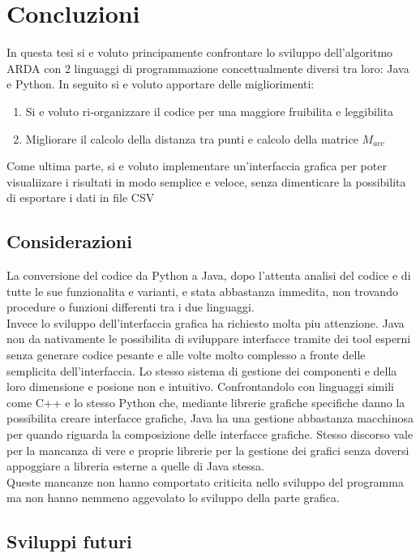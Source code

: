 \chapter{Concluzioni}
In questa tesi si e voluto principamente confrontare lo sviluppo dell'algoritmo
ARDA con 2 linguaggi di programmazione concettualmente diversi tra loro: Java e Python.
In seguito si e voluto apportare delle migliorimenti:
\begin{enumerate}
    \item Si e voluto ri-organizzare il codice per una maggiore fruibilita e leggibilita
    \item Migliorare il calcolo della distanza tra punti e calcolo della matrice $M_{acc}$
\end{enumerate}
Come ultima parte, si e voluto implementare un'interfaccia grafica per poter visualiizare
i risultati in modo semplice e veloce, senza dimenticare la possibilita di esportare i
dati in file CSV

\section{Considerazioni}
La conversione del codice da Python a Java, dopo l'attenta analisi del codice e di tutte
le sue funzionalita e varianti, e stata abbastanza immedita, non trovando procedure o
funzioni differenti tra i due linguaggi.\\
Invece lo sviluppo dell'interfaccia grafica ha richiesto molta piu attenzione.
Java non da nativamente le possibilita di sviluppare interfacce tramite dei tool esperni
senza generare codice pesante e alle volte molto complesso a fronte delle semplicita dell'interfaccia.
Lo stesso sistema di gestione dei componenti e della loro dimensione e posione non e
intuitivo. Confrontandolo con linguaggi simili come C++ e lo stesso Python che, mediante
librerie grafiche specifiche danno la possibilita creare interfacce grafiche, Java ha una
gestione abbastanza macchinosa per quando riguarda la composizione delle interfacce grafiche.
Stesso discorso vale per la mancanza di vere e proprie librerie per la gestione dei grafici
senza doversi appoggiare a libreria esterne a quelle di Java stessa.\\
Queste mancanze non hanno comportato criticita nello sviluppo del programma ma non hanno
nemmeno aggevolato lo sviluppo della parte grafica.

\section{Sviluppi futuri}
